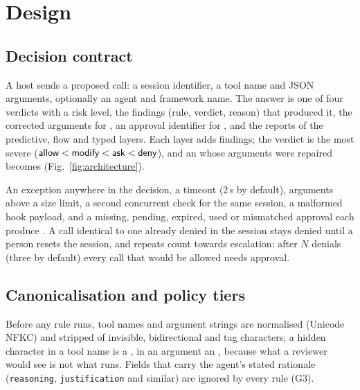 \section{Design}
\label{sec:design}



\subsection{Decision contract}
A host sends a proposed call: a session identifier, a tool name and JSON arguments, optionally an agent and framework name. The answer is one of four verdicts with a risk level, the findings (rule, verdict, reason) that produced it, the corrected arguments for , an approval identifier for , and the reports of the predictive, flow and typed layers. Each layer adds findings; the verdict is the most severe ($\textsf{allow} < \textsf{modify} < \textsf{ask} < \textsf{deny}$), and an  whose arguments were repaired becomes  (Fig.~\ref{fig:architecture}).

\begin{property}
An exception anywhere in the decision, a timeout (2\,s by default), arguments above a size limit, a second concurrent check for the same session, a malformed hook payload, and a missing, pending, expired, used or mismatched approval each produce . A call identical to one already denied in the session stays denied until a person resets the session, and repeats count towards escalation: after $N$ denials (three by default) every call that would be allowed needs approval.
\end{property}

\subsection{Canonicalisation and policy tiers}
Before any rule runs, tool names and argument strings are normalised (Unicode NFKC) and stripped of invisible, bidirectional and tag characters; a hidden character in a tool name is a , in an argument an , because what a reviewer would see is not what runs. Fields that carry the agent's stated rationale (\texttt{reasoning}, \texttt{justification} and similar) are ignored by every rule (G3).

